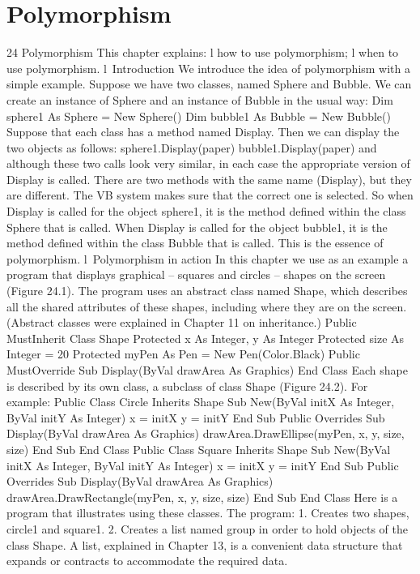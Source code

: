 \chapter{Polymorphism}

24
Polymorphism
This chapter explains:
l	how to use polymorphism;
l	when to use polymorphism.
l Introduction
We introduce the idea of polymorphism with a simple example. Suppose we have two classes, named Sphere and Bubble. We can create an instance of Sphere and an instance of Bubble in the usual way:
Dim sphere1 As Sphere = New Sphere()
Dim bubble1 As Bubble = New Bubble()
Suppose that each class has a method named Display. Then we can display the two objects as follows:
sphere1.Display(paper)
bubble1.Display(paper)
and although these two calls look very similar, in each case the appropriate version of Display is called. There are two methods with the same name (Display), but they are different. The VB system makes sure that the correct one is selected. So when Display is called for the object sphere1, it is the method deﬁned within the class Sphere that is called. When Display is called for the object bubble1, it is the method deﬁned within the class Bubble that is called. This is the essence of polymorphism.
l Polymorphism in action
In this chapter we use as an example a program that displays graphical – squares and 
circles – shapes on the screen (Figure 24.1). The program uses an abstract class named Shape, which describes all the shared attributes of these shapes, including where they are on the screen. (Abstract classes were explained in Chapter 11 on inheritance.)
Public MustInherit Class Shape
	Protected x As Integer, y As Integer
	Protected size As Integer = 20
	Protected myPen As Pen = New Pen(Color.Black)
	Public MustOverride Sub Display(ByVal drawArea As Graphics)
End Class
Each shape is described by its own class, a subclass of class Shape (Figure 24.2). For example:
Public Class Circle
	Inherits Shape
	Sub New(ByVal initX As Integer, ByVal initY As Integer)
		x = initX
		y = initY
	End Sub
	Public Overrides Sub Display(ByVal drawArea As Graphics)
		drawArea.DrawEllipse(myPen, x, y, size, size)
	End Sub
End Class
Public Class Square
	Inherits Shape
	Sub New(ByVal initX As Integer, ByVal initY As Integer)
		x = initX
		y = initY
	End Sub
	Public Overrides Sub Display(ByVal drawArea As Graphics)
		drawArea.DrawRectangle(myPen, x, y, size, size)
	End Sub
End Class
Here is a program that illustrates using these classes. The program:
1.	Creates two shapes, circle1 and square1.
2.	Creates a list named group in order to hold objects of the class Shape. A list, explained in Chapter 13, is a convenient data structure that expands or contracts to accommodate the required data.
